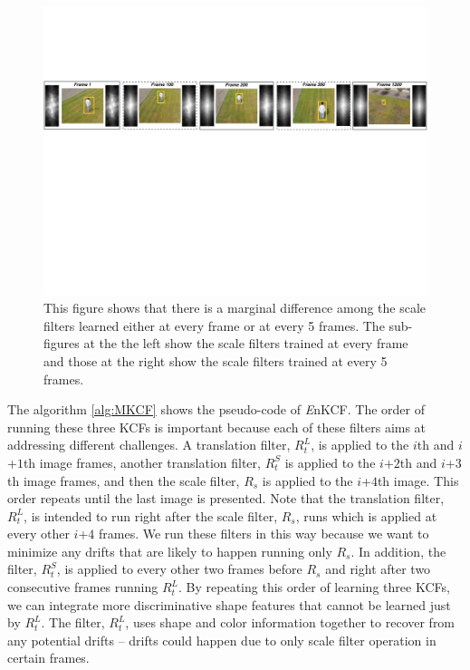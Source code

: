 \documentclass[10pt,twocolumn,letterpaper]{article}
\begin{document}
\begin{figure}[!h]
\centering
\includegraphics[width=1\textwidth]{./figures/LearnedFiltersComparison2.pdf}
\caption{This figure shows that there is a marginal difference among
  the scale filters learned either at every frame or at every 5
  frames. The sub-figures at the the left show the scale filters
  trained at every frame and those at the right show the scale filters
  trained at every 5 frames.}
\label{fig:Filters_Comparison}
\end{figure}

The algorithm \ref{alg:MKCF} shows the pseudo-code of {\it E}nKCF.
The order of running these three KCFs is important because each of
these filters aims at addressing different challenges. A translation
filter, $R_{t}^{L}$, is applied to the $i$th and $i$+$1$th image
frames, another translation filter, $R_{t}^{S}$ is applied to the
$i$+$2$th and $i$+$3$th image frames, and then the scale filter,
$R_{s}$ is applied to the $i$+$4$th image. This order repeats until
the last image is presented. Note that the translation filter,
$R_{t}^{L}$, is intended to run right after the scale filter, $R_s$,
runs which is applied at every other $i$+$4$ frames. We run these
filters in this way because we want to minimize any drifts that are
likely to happen running only $R_{s}$. In addition, the filter,
$R_{t}^{S}$, is applied to every other two frames before $R_{s}$ and
right after two consecutive frames running $R_{t}^{L}$. By repeating
this order of learning three KCFs, we can integrate more
discriminative shape features that cannot be learned just by
$R_{t}^{L}$. The filter, $R_{t}^{L}$, uses shape and color information
together to recover from any potential drifts -- drifts could happen
due to only scale filter operation in certain frames.
\end{document}
